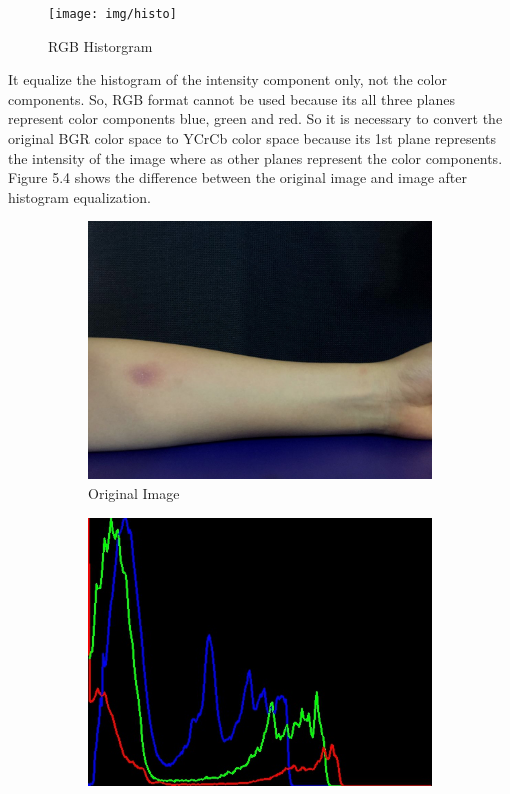 \begin{figure}[h!]
	\centering
	\texttt{[image: img/histo]}
	\caption{RGB Historgram}
\end{figure}

\newpage
It equalize the histogram of the intensity component only, not the color components. So, RGB format cannot be used because its all three planes represent color components blue, green and red. So it is necessary to convert the original BGR color space to YCrCb color space because its 1st plane represents the intensity of the image where as other planes represent the color components. Figure 5.4 shows the difference between the original image and image after histogram equalization.

\begin{figure}[!h]
\centering
\begin{subfigure}{.5\textwidth}
  \centering
  \includegraphics[scale=0.23]{img/original}
  \caption{Original Image}
  \label{fig:sub1}
\end{subfigure}%
\begin{subfigure}{.5\textwidth}
  \centering
  \includegraphics[scale=0.43]{img/image}

\end{subfigure}
\end{figure}
